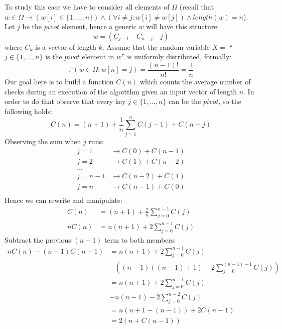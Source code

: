 To study this case we have to consider all
elements of $\Omega$ (recall that $w \in \Omega \rightarrow (w[i]\in
\{1,\ldots,n\}) \wedge (\forall i\not =j: w[i]\not=w[j]) \wedge length(w) = n$).
Let $j$ be the $pivot$ element, hence a generic $w$ will
have this structure:
\begin{displaymath}
  w = (C_{j-1} \quad C_{n-j} \quad j)
\end{displaymath}
where $C_k$ is a vector of length $k$. Assume that the random variable
$X =$ ``$ j \in \lbrace 1,\ldots,n \rbrace \text{ is the $pivot$ element in } w$''
is uniformly distributed, formally:
\begin{displaymath}
  \mathbb{P}\left(w\in\Omega: w[n]=j \right) =
  \frac{(n-1)!}{n!} =  \frac{1}{n}
\end{displaymath}
Our goal here is to build a function $C(n)$ which counts the average
number of checks during an execution of the algorithm given an input
vector of length $n$. In order to do that observe that every key $j
\in \{1,\ldots,n\}$ can be the $pivot$, so the following holds:
\begin{displaymath}
  C(n) = (n+1) +  \frac{1}{n}\sum_{j=1}^{n}{C(j-1) + C(n-j)}
\end{displaymath}
Observing the sum when $j$ runs:
\begin{displaymath}
  \begin{split}
    j=1 &\rightarrow C(0) + C(n-1) \\
    j=2 &\rightarrow C(1) + C(n-2) \\
    \ldots& \\
    j=n-1 &\rightarrow C(n-2) + C(1) \\
    j=n &\rightarrow C(n-1) + C(0) \\
  \end{split}
\end{displaymath}
Hence we can rewrite and manipulate:
\begin{displaymath}
  \begin{split}
    C(n) &= (n+1) + \frac{2}{n}\sum_{j=0}^{n-1}{C(j)}\\
    nC(n) &= n(n+1) + 2\sum_{j=0}^{n-1}{C(j)}
  \end{split}
\end{displaymath}
Subtract the previous $(n-1)$ term to both members:
\begin{displaymath}
  \begin{split}
    nC(n) -(n-1)C(n-1) &= n(n+1) + 2\sum_{j=0}^{n-1}{C(j)} \\
    &-\left((n-1)((n-1)+1) + 2\sum_{j=0}^{(n-1)-1}{C(j)}\right) \\
    &= n(n+1) + 2\sum_{j=0}^{n-1}{C(j)} \\
    &-n(n-1) - 2\sum_{j=0}^{n-2}{C(j)} \\
    &= n(n+1-(n-1)) + 2C(n-1) \\
    &= 2(n + C(n-1)) \\
  \end{split}
\end{displaymath}
